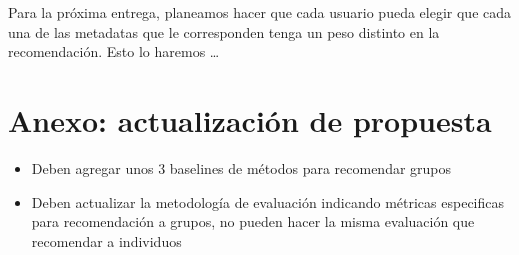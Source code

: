 \documentclass[11pt]{article}
\begin{document}
Para la próxima entrega, planeamos hacer que cada usuario pueda elegir que cada una de las metadatas que le corresponden tenga un peso distinto en la recomendación. Esto lo haremos \dots %

\section{Anexo: actualización de propuesta}
\begin{itemize}
    \item Deben agregar unos 3 baselines de métodos para recomendar grupos
    \item Deben actualizar la metodología de evaluación indicando métricas especificas para recomendación a grupos, no pueden hacer la misma evaluación que recomendar a individuos
\end{itemize}
\end{document}
